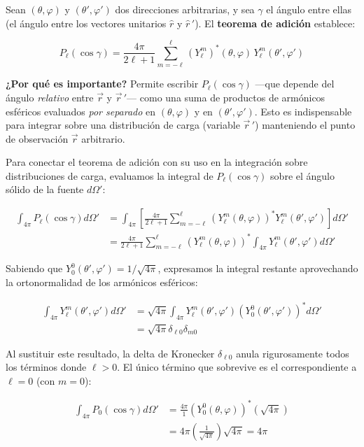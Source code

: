 \documentclass[a4paper]{article}
\begin{document}
Sean $(\theta,\varphi)$ y $(\theta',\varphi')$ dos direcciones arbitrarias, y sea $\gamma$ el ángulo entre ellas (el ángulo entre los vectores unitarios $\hat r$ y $\hat r\,'$). El \textbf{teorema de adición} establece:

\[
P_\ell(\cos\gamma)=\frac{4\pi}{2\ell+1}\sum_{m=-\ell}^{\ell}(Y_\ell^m)^*(\theta,\varphi)\,Y_\ell^m(\theta',\varphi')
\]


\textbf{¿Por qué es importante?} Permite escribir $P_\ell(\cos\gamma)$ ---que depende del ángulo \textit{relativo} entre $\vec r$ y $\vec r\,'$--- como una suma de productos de armónicos esféricos evaluados \textit{por separado} en $(\theta,\varphi)$ y en $(\theta',\varphi')$. Esto es indispensable para integrar sobre una distribución de carga (variable $\vec r\,'$) manteniendo el punto de observación $\vec r$ arbitrario. 

Para conectar el teorema de adición con su uso en la integración sobre distribuciones de carga, evaluamos la integral de $P_\ell(\cos \gamma)$ sobre el ángulo sólido de la fuente $d\Omega'$:

\begin{align*}
    \int_{4\pi} P_\ell(\cos \gamma) d\Omega' &= \int_{4\pi} \left[ \frac{4\pi}{2\ell+1} \sum_{m=-\ell}^{\ell} \left(Y_\ell^m(\theta, \varphi)\right)^* Y_\ell^m(\theta', \varphi') \right] d\Omega' \\
    &= \frac{4\pi}{2\ell+1} \sum_{m=-\ell}^{\ell} \left(Y_\ell^m(\theta, \varphi)\right)^* \int_{4\pi} Y_\ell^m(\theta', \varphi') d\Omega'
\end{align*}

Sabiendo que $Y_0^0(\theta', \varphi') = 1/\sqrt{4\pi}$, expresamos la integral restante aprovechando la ortonormalidad de los armónicos esféricos:

\begin{align*}
    \int_{4\pi} Y_\ell^m(\theta', \varphi') d\Omega' &= \sqrt{4\pi} \int_{4\pi} Y_\ell^m(\theta', \varphi') \left(Y_0^0(\theta', \varphi')\right)^* d\Omega' \\
    &= \sqrt{4\pi} \delta_{\ell 0} \delta_{m 0}
\end{align*}

Al sustituir este resultado, la delta de Kronecker $\delta_{\ell 0}$ anula rigurosamente todos los términos donde $\ell > 0$. El único término que sobrevive es el correspondiente a $\ell=0$ (con $m=0$):

\begin{align*}
    \int_{4\pi} P_0(\cos \gamma) d\Omega' &= \frac{4\pi}{1} \left(Y_0^0(\theta, \varphi)\right)^* (\sqrt{4\pi}) \\
    &= 4\pi \left(\frac{1}{\sqrt{4\pi}}\right) \sqrt{4\pi} = 4\pi
\end{align*}
\end{document}
